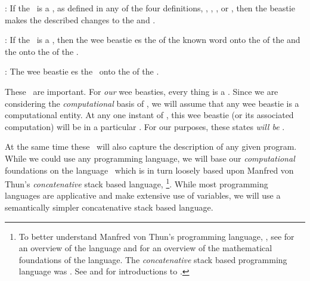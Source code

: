 \startitemize[n] 

\item {}: If the  \lol\ is a  
, as defined in any of the four definitions, 
\in[beastieBeing], \in[beastieActions], \in[beastieTests], or 
\in[beastieIdentity], then the beastie makes the described changes to the 
 and  . 

\item {}: If the  \lol\ is a  
, then the wee beastie es the 
 of the known word onto the  of the 
  and the   
onto the  of the  . 

\item {}: The wee beastie es the \lol\ 
onto the  of the  . 

\stopitemize 

\stopDefinition 

These \lols\ are important. For \emph{our} wee beasties, every thing is a 
\lol. Since we are considering the \emph{computational} basis of 
\quote{Reality}, we will assume that any wee beastie is a computational 
entity. At any one instant of \quote{time}, this wee beastie (or its 
associated computation) will be in a particular \quote{state}. For our 
purposes, these states \emph{will be} \lols.

At the same time these \lols\ will also capture the  
description of any given program. While we could use any programming 
language, we will base our \emph{computational} foundations on the 
language \joylol\ which is in turn loosely based upon Manfred von 
Thun's \emph{concatenative} stack based language, \footnote{To 
better understand Manfred von Thun's programming language, \type{joy}, see 
\cite{vonThun1994overview} for an overview of the language and 
\cite{vonThun1994mathematicalFoundations} for an overview of the 
mathematical foundations of the language. The \quote{original} 
\emph{concatenative} stack based programming language was . 
See \cite{brodie1987StartingForth} and \cite{brodie2004thinkingForth} for 
introductions to \type{Forth}.}. While most programming languages are 
applicative and make extensive use of variables, we will use a 
semantically simpler concatenative stack based language. 

